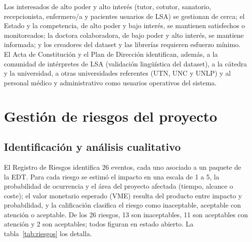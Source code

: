 Los interesados de alto poder y alto interés (tutor, cotutor, sanatorio, recepcionista, enfermero/a y pacientes usuarios de LSA) se gestionan de cerca; el Estado y la competencia, de alto poder y bajo interés, se mantienen satisfechos o monitoreados; la doctora colaboradora, de bajo poder y alto interés, se mantiene informada; y los creadores del dataset y las librerías requieren esfuerzo mínimo. El Acta de Constitución y el Plan de Dirección identifican, además, a la comunidad de intérpretes de LSA (validación lingüística del dataset), a la cátedra y la universidad, a otras universidades referentes (UTN, UNC y UNLP) y al personal médico y administrativo como usuarios operativos del sistema.

\section{Gestión de riesgos del proyecto}

\subsection{Identificación y análisis cualitativo}

El Registro de Riesgos identifica 26 eventos, cada uno asociado a un paquete de la EDT. Para cada riesgo se estimó el impacto en una escala de 1 a 5, la probabilidad de ocurrencia y el área del proyecto afectada (tiempo, alcance o coste); el valor monetario esperado (VME) resulta del producto entre impacto y probabilidad, y la calificación clasifica el riesgo como inaceptable, aceptable con atención o aceptable. De los 26 riesgos, 13 son inaceptables, 11 son aceptables con atención y 2 son aceptables; todos figuran en estado abierto. La tabla~\ref{tab:riesgos} los detalla.

